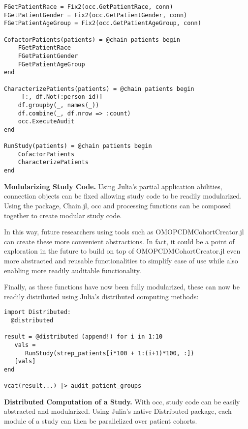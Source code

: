 \documentclass{juliacon}
\begin{document}
\begin{listing}[!ht]
\begin{verbatim}
FGetPatientRace = Fix2(occ.GetPatientRace, conn)
FGetPatientGender = Fix2(occ.GetPatientGender, conn)
FGetPatientAgeGroup = Fix2(occ.GetPatientAgeGroup, conn)

CofactorPatients(patients) = @chain patients begin
    FGetPatientRace
    FGetPatientGender
    FGetPatientAgeGroup
end

CharacterizePatients(patients) = @chain patients begin
    _[:, df.Not(:person_id)]
    df.groupby(_, names(_))
    df.combine(_, df.nrow => :count)
    occ.ExecuteAudit
end

RunStudy(patients) = @chain patients begin
    CofactorPatients
    CharacterizePatients
end
\end{verbatim}
\caption{\textbf{Modularizing Study Code.} Using Julia's partial application abilities, connection objects can be fixed allowing study code to be readily modularized. Using the package, Chain.jl, occ and processing functions can be composed together to create modular study code.}
\label{listing:modular_study}
\end{listing}

In this way, future researchers using tools such as OMOPCDMCohortCreator.jl can create these more convenient abstractions.
In fact, it could be a point of exploration in the future to build on top of OMOPCDMCohortCreator.jl even more abstracted and reusable functionalities to simplify ease of use while also enabling more readily auditable functionality.

Finally, as these functions have now been fully modularized, these can now be readily distributed using Julia's distributed computing methods:

\begin{listing}[!ht]
\begin{verbatim}
import Distributed:
  @distributed 

result = @distributed (append!) for i in 1:10
   vals = 
      RunStudy(strep_patients[i*100 + 1:(i+1)*100, :])
   [vals]
end

vcat(result...) |> audit_patient_groups
\end{verbatim}
\caption{\textbf{Distributed Computation of a Study.} With occ, study code can be easily abstracted and modularized. Using Julia's native Distributed package, each module of a study can then be parallelized over patient cohorts.}
\label{listing:study_parallelization}
\end{listing}
\end{document}
